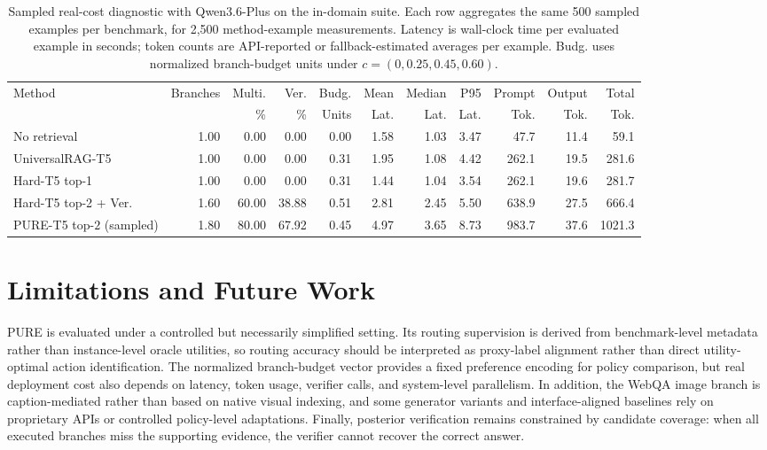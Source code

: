 \documentclass[a4paper,fleqn]{cas-dc}
\begin{document}
\begin{table}[t]
\centering
\scriptsize
\setlength{\tabcolsep}{2.4pt}
\caption{Sampled real-cost diagnostic with Qwen3.6-Plus on the in-domain suite. Each row aggregates the same 500 sampled examples per benchmark, for 2,500 method-example measurements. Latency is wall-clock time per evaluated example in seconds; token counts are API-reported or fallback-estimated averages per example. Budg. uses normalized branch-budget units under $c=(0,0.25,0.45,0.60)$.}
\label{tab:sampled_real_cost}
\begin{tabular*}{\textwidth}{@{\extracolsep{\fill}}lrrrrrrrrrr@{}}
\toprule
Method & Branches & Multi. & Ver. & Budg. & Mean & Median & P95 & Prompt & Output & Total \\
 & & \% & \% & Units & Lat. & Lat. & Lat. & Tok. & Tok. & Tok. \\
\midrule
No retrieval & 1.00 & 0.00 & 0.00 & 0.00 & 1.58 & 1.03 & 3.47 & 47.7 & 11.4 & 59.1 \\
UniversalRAG-T5 & 1.00 & 0.00 & 0.00 & 0.31 & 1.95 & 1.08 & 4.42 & 262.1 & 19.5 & 281.6 \\
Hard-T5 top-1 & 1.00 & 0.00 & 0.00 & 0.31 & 1.44 & 1.04 & 3.54 & 262.1 & 19.6 & 281.7 \\
Hard-T5 top-2 + Ver. & 1.60 & 60.00 & 38.88 & 0.51 & 2.81 & 2.45 & 5.50 & 638.9 & 27.5 & 666.4 \\
PURE-T5 top-$2$ (sampled) & 1.80 & 80.00 & 67.92 & 0.45 & 4.97 & 3.65 & 8.73 & 983.7 & 37.6 & 1021.3 \\
\bottomrule
\end{tabular*}
\end{table}

\section{Limitations and Future Work}\label{sec:limitations}

PURE is evaluated under a controlled but necessarily simplified setting. Its routing supervision is derived from benchmark-level metadata rather than instance-level oracle utilities, so routing accuracy should be interpreted as proxy-label alignment rather than direct utility-optimal action identification. The normalized branch-budget vector provides a fixed preference encoding for policy comparison, but real deployment cost also depends on latency, token usage, verifier calls, and system-level parallelism. In addition, the WebQA image branch is caption-mediated rather than based on native visual indexing, and some generator variants and interface-aligned baselines rely on proprietary APIs or controlled policy-level adaptations. Finally, posterior verification remains constrained by candidate coverage: when all executed branches miss the supporting evidence, the verifier cannot recover the correct answer.
\end{document}
